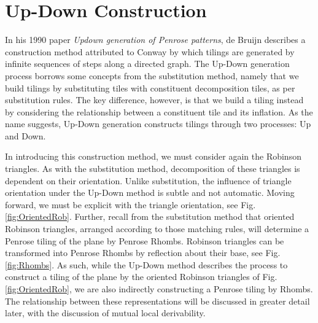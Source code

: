 \documentclass[
  oneside,
  11pt, a4paper,
  footinclude=true,
  headinclude=true,
  cleardoublepage=empty
]{scrbook}
\begin{document}
\chapter{Up-Down Construction} %

In his 1990 paper \textit{Updown generation of Penrose patterns}, de Bruijn describes a construction method attributed to Conway by which tilings are generated by infinite sequences of steps along a directed graph. The Up-Down generation process borrows some concepts from the substitution method, namely that we build tilings by substituting tiles with constituent decomposition tiles, as per substitution rules. The key difference, however, is that we build a tiling instead by considering the relationship between a constituent tile and its inflation. As the name suggests, Up-Down generation constructs tilings through two processes: Up and Down.

In introducing this construction method, we must consider again the Robinson triangles. As with the substitution method, decomposition of these triangles is dependent on their orientation. Unlike substitution, the influence of triangle orientation under the Up-Down method is subtle and not automatic. Moving forward, we must be explicit with the triangle orientation, see Fig.\ref{fig:OrientedRob}. Further, recall from the substitution method that oriented Robinson triangles, arranged according to those matching rules, will determine a Penrose tiling of the plane by Penrose Rhombs. Robinson triangles can be transformed into Penrose Rhombs by reflection about their base, see Fig.\ref{fig:Rhombs}. As such, while the Up-Down method describes the process to construct a tiling of the plane by the oriented Robinson triangles of Fig.\ref{fig:OrientedRob}, we are also indirectly constructing a Penrose tiling by Rhombs. The relationship between these representations will be discussed in greater detail later, with the discussion of mutual local derivability. 

 
\end{document}
